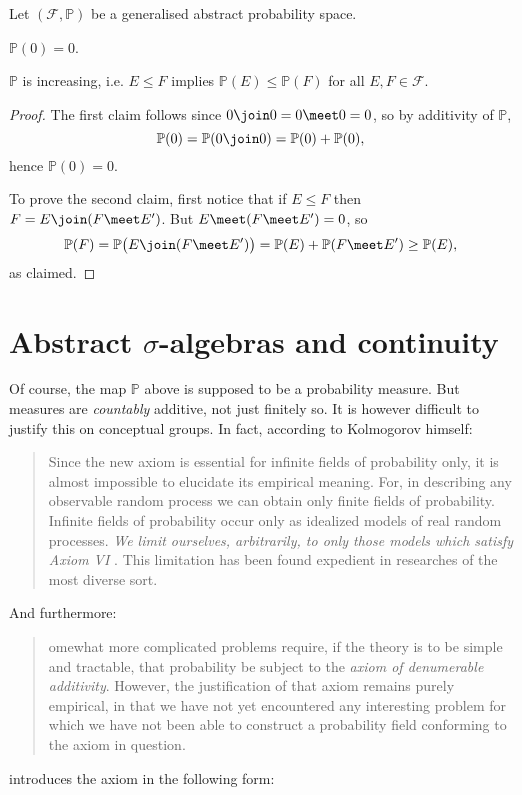 \documentclass[article, a4paper, 11pt, oneside]{memoir}
\numberwithin{equation}{chapter}
\newcommand{\calF}{\mathcal{F}}
\renewcommand{\P}{\mathbb{P}}
\begin{document}
\begin{lemma}
    Let $(\calF, \P)$ be a generalised abstract probability space.
    \begin{enumlem}
        \item $\P(0) = 0$.
        \item $\P$ is increasing, i.e. $E \leq F$ implies $\P(E) \leq \P(F)$ for all $E,F \in \calF$.
    \end{enumlem}
\end{lemma}

\begin{proof}
    The first claim follows since $0 \join 0 = 0 \meet 0 = 0$, so by additivity of $\P$,
    \begin{equation*}
        \P(0)
            = \P(0 \join 0)
            = \P(0) + \P(0),
    \end{equation*}
    hence $\P(0) = 0$.

    To prove the second claim, first notice that if $E \leq F$ then $F = E \join (F \meet E')$. But $E \meet (F \meet E') = 0$, so
    \begin{equation*}
        \P(F)
            = \P \bigl( E \join (F \meet E') \bigr)
            = \P(E) + \P(F \meet E')
            \geq \P(E),
    \end{equation*}
    as claimed.
\end{proof}


\chapter[Abstract sigma-algebras and continuity][Abstract $\sigma$-algebras and continuity]{Abstract $\sigma$-algebras and continuity}

Of course, the map $\P$ above is supposed to be a probability measure. But measures are \emph{countably} additive, not just finitely so. It is however difficult to justify this on conceptual groups. In fact, according to Kolmogorov himself:
%
\blockquote[\cite{kolmogorov1956}]{%
    Since the new axiom  is essential for infinite fields of probability only, it is almost impossible to elucidate its empirical meaning. \textelp{} For, in describing any observable random process we can obtain only finite fields of probability. Infinite fields of probability occur only as idealized models of real random processes. \emph{We limit ourselves, arbitrarily, to only those models which satisfy Axiom VI} . This limitation has been found expedient in researches of the most diverse sort.%
}
%
And furthermore:
%
\blockquote[\cite{kolmogorov1995}]{%
    omewhat more complicated problems require, if the theory is to be simple and tractable, that probability be subject to the \emph{axiom of denumerable additivity}. However, the justification of that axiom remains purely empirical, in that we have not yet encountered any interesting problem for which we have not been able to construct a probability field conforming to the axiom in question.%
}
%
\textcite{kolmogorov1956} introduces the axiom in the following form:
\end{document}
